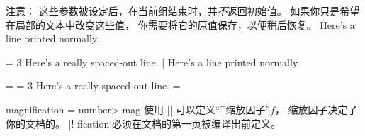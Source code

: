 注意：
这些参数被设定后，在当前组结束时，并\emph{不}返回初始值。
如果你只是希望在局部的文本中改变这些值，
你需要将它的原值保存，以便稍后恢复。
\example
Here's a line printed normally.\par
{}\font = 3\font
\noindent Here's a really spaced-out line.
|
\produces
Here's a line printed normally.\par
{} = \font %
\font = 3\font
\noindent Here's a really spaced-out line.
\font = 
\endexample
\enddesc

\begindesc
\cts magnification {{\bt =} \<number>}
\cts mag {}
\explain
{}
使用 |\magnification| 可以定义“^{缩放因子}”$f$，
缩放因子决定了你的文档的。
|\magni!-fication|必须在文档的第一页被编译出前定义。


